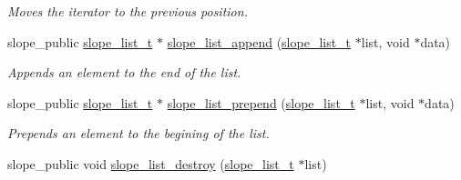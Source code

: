 \begin{DoxyCompactItemize}
\begin{DoxyCompactList}\small\item\em Moves the iterator to the previous position. \end{DoxyCompactList}\item 
slope\+\_\+public \hyperlink{struct__slope__list}{slope\+\_\+list\+\_\+t} $\ast$ \hyperlink{group__List_ga44d52be6db2e8321a4a81fb481212f54}{slope\+\_\+list\+\_\+append} (\hyperlink{struct__slope__list}{slope\+\_\+list\+\_\+t} $\ast$list, void $\ast$data)
\begin{DoxyCompactList}\small\item\em Appends an element to the end of the list. \end{DoxyCompactList}\item 
slope\+\_\+public \hyperlink{struct__slope__list}{slope\+\_\+list\+\_\+t} $\ast$ \hyperlink{group__List_ga770e1a1761295088a2e769f10c50e9e7}{slope\+\_\+list\+\_\+prepend} (\hyperlink{struct__slope__list}{slope\+\_\+list\+\_\+t} $\ast$list, void $\ast$data)
\begin{DoxyCompactList}\small\item\em Prepends an element to the begining of the list. \end{DoxyCompactList}\item 
\hypertarget{group__List_gad1f8ec4bc7db2daff96765ed708437b2}{slope\+\_\+public void \hyperlink{group__List_gad1f8ec4bc7db2daff96765ed708437b2}{slope\+\_\+list\+\_\+destroy} (\hyperlink{struct__slope__list}{slope\+\_\+list\+\_\+t} $\ast$list)}\label{group__List_gad1f8ec4bc7db2daff96765ed708437b2}


\end{DoxyCompactItemize}
